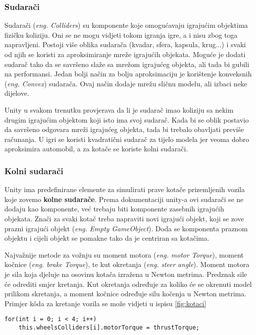 \subsubsection{Sudarači}
Sudarači (\emph{eng. Colliders}) su komponente koje omogućavaju igrajućim objektima fizičku koliziju. Oni se ne mogu vidjeti tokom igranja igre, a i nisu zbog toga napravljeni. Postoji više oblika sudarača (kvadar, sfera, kapsula, krug...) i svaki od njih se koristi za aproksimiranje mreže igrajućih objekata. Moguće je dodati sudarač tako da se savršeno slaže sa mrežom igrajućeg objekta, ali tada bi gubili na performansi. Jedan bolji način za bolju aproksimaciju je korištenje konveksnih (\emph{eng. Convex}) sudarača. Ovaj način dodaje mrežu sličnu modelu, ali izbaci neke dijelove. \par
Unity u svakom trenutku provjerava da li je sudarač imao koliziju sa nekim drugim igrajućim objektom koji isto ima svoj sudarač. Kada bi se oblik postavio da savršeno odgovara mreži igrajućeg objekta, tada bi trebalo obavljati previše računanja. U igri se koristi kvadratični sudarač za tijelo modela jer veoma dobro aproksimira automobil, a za kotače se koriste kolni sudarači.
\subsubsection{Kolni sudarači}
Unity ima predefinirane elemente za simulirati prave kotače prizemljenih vozila koje zovemo \textbf{kolne sudarače}. Prema dokumentaciji unity-a ovi sudarači se ne dodaju kao komponente, već trebaju biti komponente zasebnih igrajućih objekata. Znači za svaki kotač treba napraviti novi igrajući objekt, koji se zove prazni igrajući objekt (\emph{eng. Empty GameObject}). Doda se komponenta praznom objektu i cijeli objekt se pomakne tako da je centriran sa kotačima. \newpage \par
Najvažnije metode za vožnju su moment motora (\emph{eng. motor Torque}), moment kočnice (\emph{eng. brake Torque}), te kut okretanja (\emph{eng. steer angle}). Moment motora je sila koja djeluje na osovinu kotača izražena u Newton metrima. Predznak sile će odrediti smjer kretanja. Kut okretanja određuje za koliko će se okrenuti model prilikom skretanja, a moment kočnice određuje silu kočenja u Newton metrima. Primjer k\^oda za kretanje vozila se može vidjeti u ispisu \ref{fig:kotaci}

\begin{lstlisting}[caption={Skripta za kretanje vozila}, label=kretanjeVozila]
for(int i = 0; i < 4; i++)
    this.wheelsColliders[i].motorTorque = thrustTorque;
\end{lstlisting}

